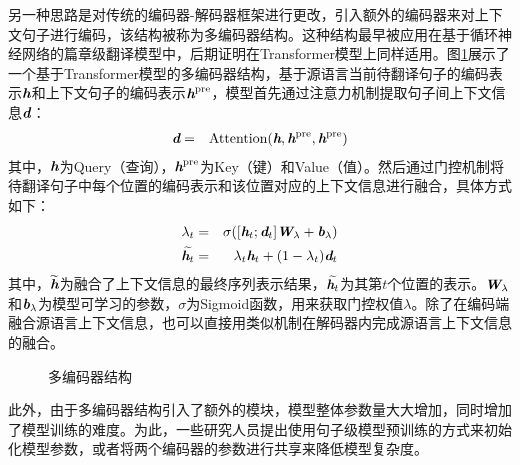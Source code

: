 \parinterval 另一种思路是对传统的编码器-解码器框架进行更改，引入额外的编码器来对上下文句子进行编码，该结构被称为多编码器结构。这种结构最早被应用在基于循环神经网络的篇章级翻译模型中，后期证明在Transformer模型上同样适用。图\ref{fig:17-18}展示了一个基于Transformer模型的多编码器结构，基于源语言当前待翻译句子的编码表示$\textbf{\em h}$和上下文句子的编码表示$\textbf{\em h}^{\textrm {pre}}$，模型首先通过注意力机制提取句子间上下文信息$\textbf{\em d}$：
\begin{eqnarray}
\textbf{\em d}&=&\textrm{Attention}(\textbf{\em h},\textbf{\em h}^{\textrm {pre}},\textbf{\em h}^{\textrm {pre}})
\label{eq:17-3-3}
\end{eqnarray}
其中，$\textbf{\em h}$为Query（查询），$\textbf{\em h}^{\textrm {pre}}$为Key（键）和Value（值）。然后通过门控机制将待翻译句子中每个位置的编码表示和该位置对应的上下文信息进行融合，具体方式如下：
\begin{eqnarray}
\lambda_{t}&=&\sigma([\textbf{\em h}_{t};\textbf{\em d}_{t}]\textbf{\em W}_{\lambda}+\textbf{\em b}_{\lambda})
\label{eq:17-3-5}\\
\widetilde{\textbf{\em h}_{t}}&=&\lambda_{t}\textbf{\em h}_{t}+(1-\lambda_{t})\textbf{\em d}_{t}
\label{eq:17-3-4}
\end{eqnarray}
其中，$\widetilde{\textbf{\em h}}$为融合了上下文信息的最终序列表示结果，$\widetilde{\textbf{\em h}_{t}}$为其第$t$个位置的表示。$\textbf{\em W}_{\lambda}$和$\textbf{\em b}_{\lambda}$为模型可学习的参数，$\sigma$为Sigmoid函数，用来获取门控权值$\lambda$。除了在编码端融合源语言上下文信息，也可以直接用类似机制在解码器内完成源语言上下文信息的融合。

\begin{figure}[htp]
    \centering
	
    \caption{多编码器结构}
    \label{fig:17-18}
\end{figure}

\parinterval 此外，由于多编码器结构引入了额外的模块，模型整体参数量大大增加，同时增加了模型训练的难度。为此，一些研究人员提出使用句子级模型预训练的方式来初始化模型参数，或者将两个编码器的参数进行共享来降低模型复杂度。

